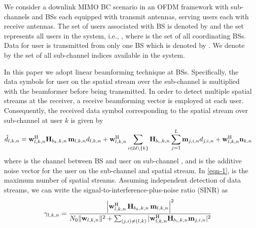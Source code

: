 We consider a downlink \ac{MIMO} \ac{BC} scenario in an \ac{OFDM} framework with  sub-channels and  \acp{BS} each equipped with  transmit antennas, serving  users each with  receive antennas. The set of users associated with \ac{BS}  is denoted by  and the set  represents all users in the system, i.e., , where  is the set of all coordinating \acp{BS}. Data for user  is transmitted from only one \ac{BS} which is denoted by . We denote by  the set of all sub-channel indices available in the system.

In this paper we adopt linear beamforming technique at \acp{BS}. Specifically, the data symbols  for  user  on the  spatial stream over the sub-channel  is multiplied with the beamformer  before being transmitted.   In order to detect  multiple spatial streams at the receiver, a receive beamforming vector  is employed at each user. Consequently, the received data symbol corresponding to the  spatial stream over sub-channel  at user $k$ is given by
\begin{equation}\label{eqn-1}
\hat{d}_{l,k,n} = \mvec{w}{l,k,n}^\herm \mvec{H}{b_k,k,n} \,\mvec{m}{l,k,n} d_{l,k,n} + \mvec{w}{l,k,n}^\herm \sum_{i \in \mc{U} \backslash \set{k}} \mvec{H}{b_i,k,n} \sum_{j = 1}^L \mvec{m}{j,i,n}d_{j,i,n} + \mvec{w}{l,k,n}^\herm \mvec{n}{k,n}
\end{equation}
where  is the channel between \ac{BS}  and  user  on sub-channel , and   is the additive noise vector for the user  on the  sub-channel and  spatial stream. In \eqref{eqn-1},  is the maximum number of spatial streams. Assuming independent detection of data streams, we can write the signal-to-interference-plus-noise ratio (SINR) as
\begin{equation}\label{eq:SINR}
\gamma_{l,k,n} = \dfrac{\left |\mvec{w}{l,k,n}^\herm \, \mvec{H}{b_k,k,n} \, \mvec{m}{l,k,n} \right |^2}{N_0\|\mvec{w}{l,k,n}\|^2 + \sum_{(j,i) \neq (l,k)} |\mvec{w}{l,k,n}^\herm \mvec{H}{b_i,k,n} \mvec{m}{j,i,n} |^2}
\end{equation}
